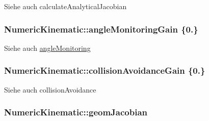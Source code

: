 \begin{DoxySeeAlso}{Siehe auch}
calculate\-Analytical\-Jacobian 
\end{DoxySeeAlso}
\hypertarget{classNumericKinematic_abcb83da2f2e4934765c8522ac0569405}{
\subsubsection[{angle\-Monitoring\-Gain}]{\setlength{\rightskip}{0pt plus 5cm}Numeric\-Kinematic\-::angle\-Monitoring\-Gain \{0.\}\hspace{0.3cm}{\ttfamily [private]}}}\label{classNumericKinematic_abcb83da2f2e4934765c8522ac0569405}
\begin{DoxySeeAlso}{Siehe auch}
\hyperlink{classNumericKinematic_ad3306dc5d1753c1bc403e5274c725ada}{angle\-Monitoring} 
\end{DoxySeeAlso}
\hypertarget{classNumericKinematic_a2e5991d67d0e27b171a1ef8f4b759913}{
\subsubsection[{collision\-Avoidance\-Gain}]{\setlength{\rightskip}{0pt plus 5cm}Numeric\-Kinematic\-::collision\-Avoidance\-Gain \{0.\}\hspace{0.3cm}{\ttfamily [private]}}}\label{classNumericKinematic_a2e5991d67d0e27b171a1ef8f4b759913}
\begin{DoxySeeAlso}{Siehe auch}
collision\-Avoidance 
\end{DoxySeeAlso}
\hypertarget{classNumericKinematic_a3d773d5b89a38a88ed664896fb139f48}{
\subsubsection[{geom\-Jacobian}]{\setlength{\rightskip}{0pt plus 5cm}Numeric\-Kinematic\-::geom\-Jacobian\hspace{0.3cm}{\ttfamily [private]}}}\label{classNumericKinematic_a3d773d5b89a38a88ed664896fb139f48}


